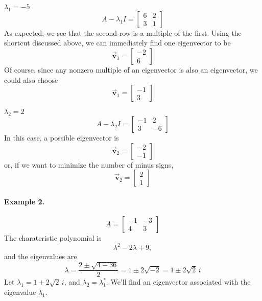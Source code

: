 \documentclass{book}
\newcommand{\BV}{\vec{\textbf{v}}}
\begin{document}
\medskip
\noindent
\underline{$\lambda_1 = -5$}
\[
   A-\lambda_1 I = \begin{bmatrix}
                   6 & 2 \\ 3 & 1
                   \end{bmatrix}
\]
As expected, we see that the second row
is a multiple of the first. Using the shortcut discussed
above, we can immediately find one eigenvector to be
\[
   \BV_1 = \begin{bmatrix} -2 \\ 6 \end{bmatrix}
\]
Of course, since any nonzero multiple of an eigenvector
is also an eigenvector, we could also choose
\[
   \BV_1 = \begin{bmatrix} -1 \\ 3 \end{bmatrix}
\]

\medskip
\noindent
\underline{$\lambda_2 = 2$}
\[
  A - \lambda_2 I = \begin{bmatrix}
                      -1 & 2 \\ 3 & -6
                    \end{bmatrix}
\]
In this case, a possible eigenvector is
\[
  \BV_2 = \begin{bmatrix} -2 \\ -1 \end{bmatrix}
\]
or, if we want to minimize the number of minus signs,
\[
  \BV_2 = \begin{bmatrix} 2 \\ 1 \end{bmatrix}
\]

\paragraph{Example 2.}
\[
   A = \begin{bmatrix} -1 & -3 \\ 4 & 3 \end{bmatrix}
\]
The charateristic polynomial is
\[
  \lambda^2 - 2\lambda + 9,
\]
and the eigenvalues are
\[
  \lambda = \frac{2\pm \sqrt{4-36}}{2} = 1\pm 2\sqrt{-2}
    = 1 \pm 2 \sqrt{2} \, i
\]
Let $\lambda_1 = 1 + 2\sqrt{2}\, i$, and $\lambda_2 = \lambda_1^{*}$.
We'll find an eigenvector associated with
the eigenvalue $\lambda_1$.
\end{document}
